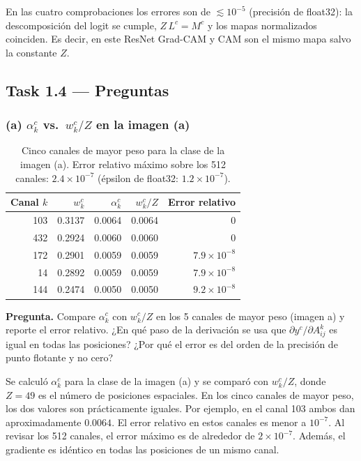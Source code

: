 \documentclass[11pt]{article}
\renewcommand{\_}{\textunderscore\allowbreak{}}
\begin{document}
En las cuatro comprobaciones los errores son de \(\lesssim10^{-5}\) (precisión de float32): la descomposición del logit se cumple, \(Z\,L^c = M^c\) y los mapas normalizados coinciden. Es decir, en este ResNet Grad-CAM y CAM son el mismo mapa salvo la constante \(Z\).


\subsection*{Task 1.4 --- Preguntas}
\subsubsection*{(a) $\alpha_k^c$ vs.\ $w_k^c/Z$ en la imagen (a)}
\begin{table}[H]
\centering
\small
\begin{tabular}{rrrrr}
\toprule
Canal $k$ & $w_k^c$ & $\alpha_k^c$ & $w_k^c/Z$ & Error relativo \\
\midrule
103 & 0.3137 & 0.0064 & 0.0064 & $0$ \\
432 & 0.2924 & 0.0060 & 0.0060 & $0$ \\
172 & 0.2901 & 0.0059 & 0.0059 & $7.9\times10^{-8}$ \\
14 & 0.2892 & 0.0059 & 0.0059 & $7.9\times10^{-8}$ \\
144 & 0.2474 & 0.0050 & 0.0050 & $9.2\times10^{-8}$ \\
\bottomrule
\end{tabular}
\caption{Cinco canales de mayor peso para la clase de la imagen (a). Error relativo máximo sobre los 512 canales: $2.4\times10^{-7}$ (épsilon de float32: $1.2\times10^{-7}$).}
\end{table}

\begin{tcolorbox}[colback=yellow!12, colframe=orange!70!black, boxrule=0.5pt, left=4pt, right=4pt]
\textbf{Pregunta.} Compare \(\alpha_k^c\) con \(w_k^c/Z\) en los 5 canales de mayor peso (imagen a) y reporte el error relativo. ¿En qué paso de la derivación se usa que \(\partial y^c/\partial A^k_{ij}\) es igual en todas las posiciones? ¿Por qué el error es del orden de la precisión de punto flotante y no cero?
\end{tcolorbox}

Se calculó \(\alpha_k^c\) para la clase de la imagen (a) y se comparó con \(w_k^c/Z\), donde \(Z = 49\) es el número de posiciones espaciales. En los cinco canales de mayor peso, los dos valores son prácticamente iguales. Por ejemplo, en el canal 103 ambos dan aproximadamente \(0.0064\). El error relativo en estos canales es menor a \(10^{-7}\). Al revisar los 512 canales, el error máximo es de alrededor de \(2\times10^{-7}\). Además, el gradiente es idéntico en todas las posiciones de un mismo canal.
\end{document}
